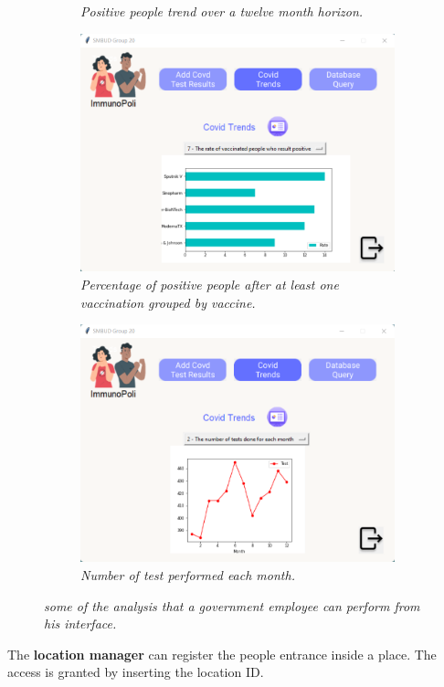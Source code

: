 \begin{figure}[h]
\begin{subfigure}{.5\textwidth}
  \caption{\textit{Positive people trend over a twelve month horizon.}}
  \label{fig:positive_trend}
\end{subfigure}
\begin{subfigure}{.5\textwidth}
  \centering
  \includegraphics[width=\linewidth]{images/application_screenshots/rate_positive_vaccinated.png}  
  \caption{\textit{Percentage of positive people after at least one vaccination grouped by vaccine.}}
  \label{fig:positive_vaccinated}
\end{subfigure}
\begin{subfigure}{.5\textwidth}
  \centering
  \includegraphics[width=\linewidth]{images/application_screenshots/test_trends.png}  
  \caption{\textit{Number of test performed each month.}}
  \label{fig:test_trends}
\end{subfigure}
\caption{\textit{some of the analysis that a government employee can perform from his interface.}}
\label{fig:trends}
\end{figure}
\newpage
\noindent
The \textbf{location manager} can register the people entrance inside a place. The access is granted by inserting the location ID.

